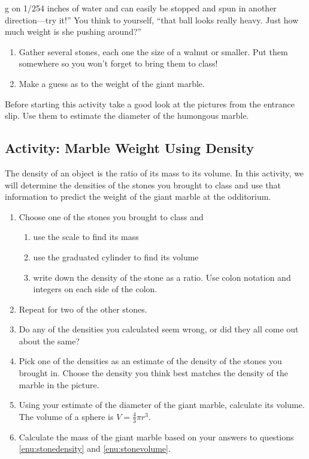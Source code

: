 g on 1/254 inches of water and can easily be stopped and spun in another direction---try it!'' You think to yourself, ``that ball looks really heavy. Just how much weight is she pushing around?''

\begin{enumerate}
    \item Gather several stones, each one the size of a walnut or smaller. Put them somewhere so you won't forget to bring them to class!\wbvfill
    \item Make a guess as to the weight of the giant marble.\wbvfill
\end{enumerate}

\wbnewpage
\noindent Before starting this activity take a good look at the pictures from the entrance slip. Use them to estimate the diameter of the humongous marble. 

\subsection{Activity: Marble Weight Using Density}
The density of an object is the ratio of its mass to its volume. In this activity, we will determine the densities of the stones you brought to class and use that information to predict the weight of the giant marble at the odditorium.
\begin{enumerate}
    \item Choose one of the stones you brought to class and
    \begin{enumerate}
        \item use the scale to find its mass\wbvfill
        \item use the graduated cylinder to find its volume\wbvfill
        \item write down the density of the stone as a ratio. Use colon notation and integers on each side of the colon.\wbvfill
    \end{enumerate}
    \item Repeat for two of the other stones.
    \item Do any of the densities you calculated seem wrong, or did they all come out about the same?\wbvfill
    \item \label{enu:stonedensity}Pick one of the densities as an estimate of the density of the stones you brought in. Choose the density you think best matches the density of the marble in the picture.\wbvfill
    \item \label{enu:stonevolume}Using your estimate of the diameter of the giant marble, calculate its volume. The volume of a sphere is $V=\frac43\pi r^3$.\wbvfill
    \item Calculate the mass of the giant marble based on your answers to questions \ref{enu:stonedensity} and \ref{enu:stonevolume}. \wbvfill
\end{enumerate}

